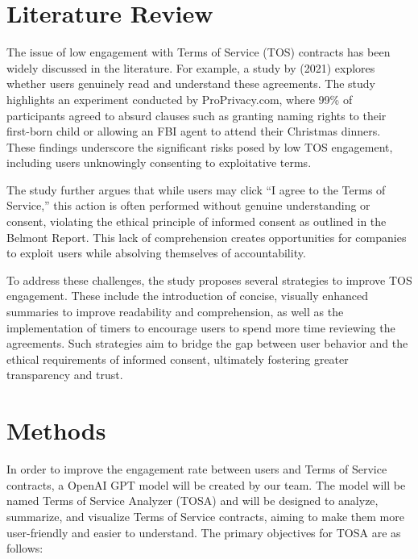 \documentclass[sigconf, nonacm]{acmart}
\begin{document}
\section{Literature Review}
The issue of low engagement with Terms of Service (TOS) contracts has been widely discussed in the literature. For example, a study by \cite{ivanfanta2021} (2021) explores whether users genuinely read and understand these agreements. The study highlights an experiment conducted by ProPrivacy.com, where 99\% of participants agreed to absurd clauses such as granting naming rights to their first-born child or allowing an FBI agent to attend their Christmas dinners. These findings underscore the significant risks posed by low TOS engagement, including users unknowingly consenting to exploitative terms.

The study further argues that while users may click “I agree to the Terms of Service,” this action is often performed without genuine understanding or consent, violating the ethical principle of informed consent as outlined in the Belmont Report. This lack of comprehension creates opportunities for companies to exploit users while absolving themselves of accountability.

To address these challenges, the study proposes several strategies to improve TOS engagement. These include the introduction of concise, visually enhanced summaries to improve readability and comprehension, as well as the implementation of timers to encourage users to spend more time reviewing the agreements. Such strategies aim to bridge the gap between user behavior and the ethical requirements of informed consent, ultimately fostering greater transparency and trust.

\section{Methods}
In order to improve the engagement rate between users and Terms of Service contracts, a OpenAI GPT model will be created by our team. The model will be named Terms of Service Analyzer (TOSA) and will be designed to analyze, summarize, and visualize Terms of Service contracts, aiming to make them more user-friendly and easier to understand. The primary objectives for TOSA are as follows:
\end{document}
